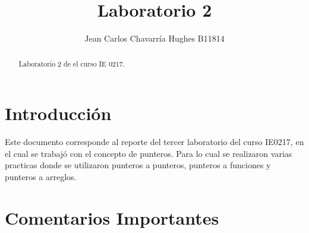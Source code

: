 \documentclass{article}
\begin{document}
\title{Laboratorio 2}
\author{Jean Carlos Chavarr\' ia Hughes B11814}
\maketitle
\begin{abstract}
Laboratorio 2 de el curso IE 0217.
\end{abstract}
\section{Introducci\' on}
Este documento corresponde al reporte del tercer laboratorio del curso IE0217, en el cual se trabaj\' o con el concepto de punteros. Para lo cual se realizaron varias practicas donde se utilizaron punteros a punteros, punteros a funciones y punteros a arreglos.

\section{Comentarios Importantes}
\end{document}
